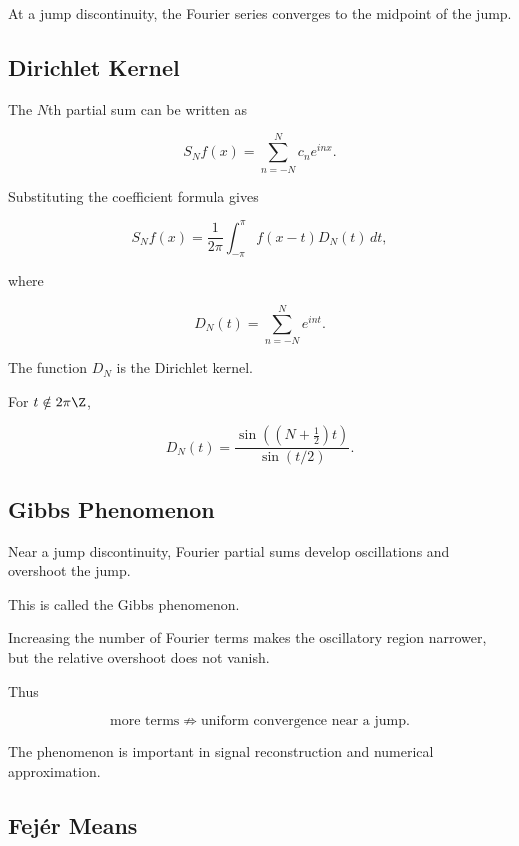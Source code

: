 At a jump discontinuity, the Fourier series converges to the midpoint of
the jump.

\subsection{Dirichlet Kernel}
\label{subsec:dirichlet-kernel}

The \(N\)th partial sum can be written as

\[
S_Nf(x)
=
\sum_{n=-N}^{N}c_ne^{inx}.
\]

Substituting the coefficient formula gives

\[
\boxed{
S_Nf(x)
=
\frac{1}{2\pi}
\int_{-\pi}^{\pi}
f(x-t)D_N(t)\,dt,
}
\]

where

\[
\boxed{
D_N(t)
=
\sum_{n=-N}^{N}e^{int}.
}
\]

The function \(D_N\) is the Dirichlet kernel.

For \(t\notin2\pi\Z\),

\[
\boxed{
D_N(t)
=
\frac{
\sin\left((N+\frac12)t\right)
}{
\sin(t/2)
}.
}
\]

\subsection{Gibbs Phenomenon}
\label{subsec:gibbs-phenomenon}

Near a jump discontinuity, Fourier partial sums develop oscillations and
overshoot the jump.

This is called the Gibbs phenomenon.

Increasing the number of Fourier terms makes the oscillatory region
narrower, but the relative overshoot does not vanish.

Thus

\[
\boxed{
\text{more terms}
\not\Rightarrow
\text{uniform convergence near a jump}.
}
\]

The phenomenon is important in signal reconstruction and numerical
approximation.

\subsection{Fej\'er Means}
\label{subsec:fejer-means}

